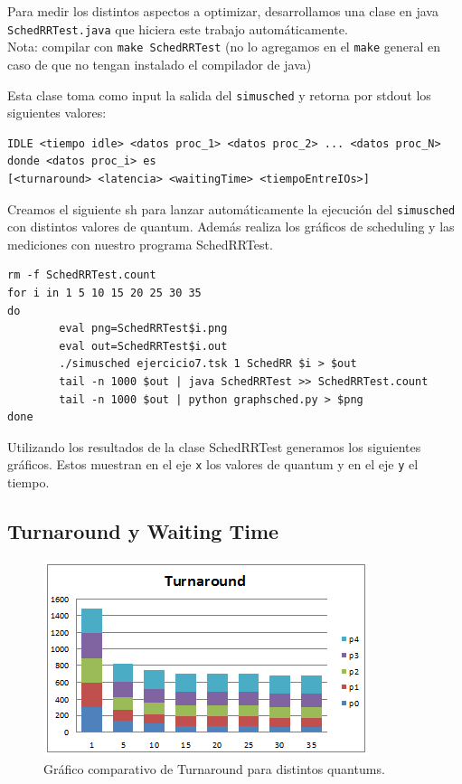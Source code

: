 Para medir los distintos aspectos a optimizar, desarrollamos una clase en java \verb|SchedRRTest.java| que hiciera este trabajo autom\'aticamente.\\
Nota: compilar con \verb|make SchedRRTest| (no lo agregamos en el \verb|make| general en caso de que no tengan instalado el compilador de java)

Esta clase toma como input la salida del \verb|simusched| y retorna por stdout los siguientes valores:

\begin{verbatim}
IDLE <tiempo idle> <datos proc_1> <datos proc_2> ... <datos proc_N>
donde <datos proc_i> es
[<turnaround> <latencia> <waitingTime> <tiempoEntreIOs>]
\end{verbatim}

Creamos el siguiente sh para lanzar autom\'aticamente la ejecuci\'on del \verb|simusched| con distintos valores de quantum. Adem\'as realiza los gr\'aficos de scheduling y las mediciones con nuestro programa SchedRRTest.

\begin{framed}
\begin{verbatim}
rm -f SchedRRTest.count
for i in 1 5 10 15 20 25 30 35
do
        eval png=SchedRRTest$i.png
        eval out=SchedRRTest$i.out
        ./simusched ejercicio7.tsk 1 SchedRR $i > $out
        tail -n 1000 $out | java SchedRRTest >> SchedRRTest.count
        tail -n 1000 $out | python graphsched.py > $png
done
\end{verbatim}
\end{framed}

Utilizando los resultados de la clase SchedRRTest generamos los siguientes gr\'aficos. Estos muestran en el eje \verb|x| los valores de quantum y en el eje \verb|y| el tiempo.

\subsection{Turnaround y Waiting Time}
\begin{figure}[H]
  \centering
    \includegraphics{img/turnaround.png}
    \caption{Gr\'afico comparativo de Turnaround para distintos quantums.}
\end{figure}

